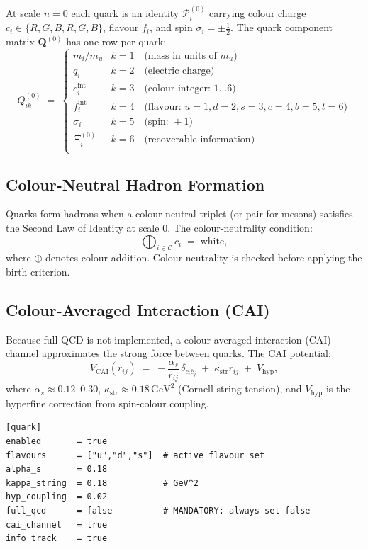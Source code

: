 \documentclass[11pt,a4paper]{article}
\newcommand{\Pid}{\mathscr{P}}
\newcommand{\Rec}{\Xi}
\begin{document}
At scale $n=0$ each quark is an identity $\Pid_i^{(0)}$ carrying colour
charge $c_i \in \{R, G, B, \bar R, \bar G, \bar B\}$, flavour $f_i$, and
spin $\sigma_i = \pm\tfrac{1}{2}$.  The quark component matrix $\mathbf{Q}^{(0)}$
has one row per quark:
\[
  Q^{(0)}_{ik} \;=\;
  \begin{cases}
    m_i / m_u     & k=1 \quad\text{(mass in units of } m_u\text{)} \\
    q_i           & k=2 \quad\text{(electric charge)} \\
    c_i^{\mathrm{int}} & k=3 \quad\text{(colour integer: } 1\ldots 6\text{)} \\
    f_i^{\mathrm{int}} & k=4 \quad\text{(flavour: } u=1,d=2,s=3,c=4,b=5,t=6\text{)} \\
    \sigma_i       & k=5 \quad\text{(spin: } \pm 1\text{)} \\
    \Rec_i^{(0)}   & k=6 \quad\text{(recoverable information)} \\
  \end{cases}
\]

\subsection{Colour-Neutral Hadron Formation}

Quarks form hadrons when a colour-neutral triplet (or pair for mesons)
satisfies the Second Law of Identity at scale 0.  The colour-neutrality
condition:
\[
  \bigoplus_{i \in \mathcal{C}} c_i \;=\; \text{white} ,
\]
where $\oplus$ denotes colour addition.  Colour neutrality is checked
before applying the birth criterion.

\subsection{Colour-Averaged Interaction (CAI)}

Because full QCD is not implemented, a colour-averaged interaction (CAI)
channel approximates the strong force between quarks.  The CAI potential:
\[
  V_{\mathrm{CAI}}(r_{ij}) \;=\;
  -\frac{\alpha_s}{r_{ij}} \,\delta_{c_i \bar c_j}
  \;+\; \kappa_{\mathrm{str}} r_{ij}
  \;+\; V_{\mathrm{hyp}} ,
\]
where $\alpha_s \approx 0.12$--$0.30$, $\kappa_{\mathrm{str}} \approx
0.18\,\mathrm{GeV}^2$ (Cornell string tension), and $V_{\mathrm{hyp}}$ is
the hyperfine correction from spin-colour coupling.

\begin{lstlisting}[language={}, caption={Quark configuration block (reference implementation).}]
[quark]
enabled       = true
flavours      = ["u","d","s"]  # active flavour set
alpha_s       = 0.18
kappa_string  = 0.18           # GeV^2
hyp_coupling  = 0.02
full_qcd      = false          # MANDATORY: always set false
cai_channel   = true
info_track    = true
\end{lstlisting}
\end{document}
